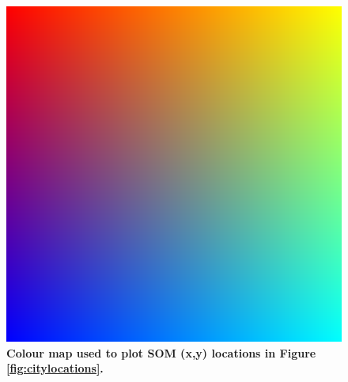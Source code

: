 \begin{figure}
\centering
\includegraphics[trim={0 0 0 0},clip,scale=0.15]{cubediagonal.png}
\caption{\bf Colour map used to plot SOM (x,y) locations in Figure \ref{fig:citylocations}. }
 \label{fig:colormap}
\end{figure} 

